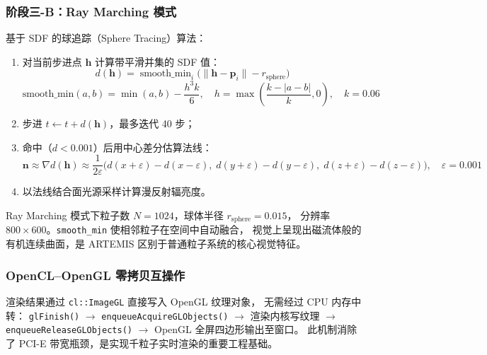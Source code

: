 \subsubsection{阶段三-B：Ray Marching 模式}

基于 SDF 的球追踪（Sphere Tracing）算法：
\begin{enumerate}
  \item 对当前步进点 $\mathbf{h}$ 计算带平滑并集的 SDF 值：
        \begin{equation}
          d(\mathbf{h}) =
          \mathop{\mathrm{smooth\_min}}_{i}
          \bigl(\|\mathbf{h}-\mathbf{p}_i\|-r_{\mathrm{sphere}}\bigr)
        \end{equation}
        \begin{equation}
          \mathrm{smooth\_min}(a,b)=\min(a,b)-\frac{h^3 k}{6},\quad
          h=\max\!\left(\frac{k-|a-b|}{k},0\right),\quad k=0.06
        \end{equation}
  \item 步进 $t\leftarrow t+d(\mathbf{h})$，最多迭代 40 步；
  \item 命中（$d<0.001$）后用中心差分估算法线：
        \begin{equation}
          \mathbf{n} \approx \nabla d(\mathbf{h}) \approx
          \frac{1}{2\varepsilon}
          \bigl(d(x+\varepsilon)-d(x-\varepsilon),\;
                d(y+\varepsilon)-d(y-\varepsilon),\;
                d(z+\varepsilon)-d(z-\varepsilon)\bigr),
          \quad \varepsilon=0.001
        \end{equation}
  \item 以法线结合面光源采样计算漫反射辐亮度。
\end{enumerate}

Ray Marching 模式下粒子数 $N=1024$，球体半径 $r_{\mathrm{sphere}}=0.015$，
分辨率 $800\times600$。\texttt{smooth\_min} 使相邻粒子在空间中自动融合，
视觉上呈现出磁流体般的有机连续曲面，是 ARTEMIS 区别于普通粒子系统的核心视觉特征。

\subsubsection{OpenCL–OpenGL 零拷贝互操作}

渲染结果通过 \texttt{cl::ImageGL} 直接写入 OpenGL 纹理对象，
无需经过 CPU 内存中转：
\texttt{glFinish()} $\to$ \texttt{enqueueAcquireGLObjects()} $\to$
渲染内核写纹理 $\to$ \texttt{enqueueReleaseGLObjects()} $\to$
OpenGL 全屏四边形输出至窗口。
此机制消除了 PCI-E 带宽瓶颈，是实现千粒子实时渲染的重要工程基础。

